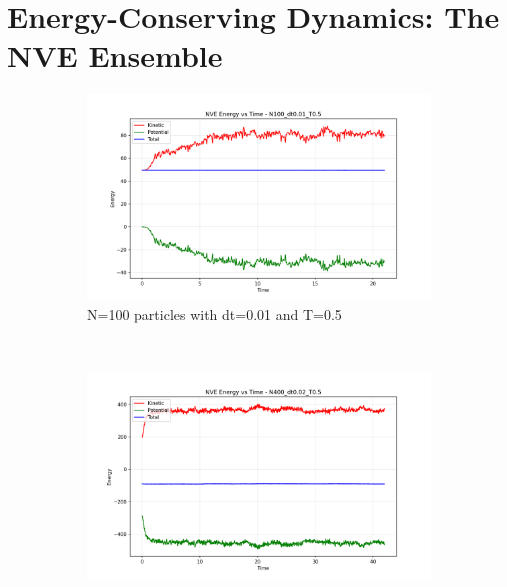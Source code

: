 \section{Energy-Conserving Dynamics: The NVE Ensemble}\label{sec:energy_conserving_dynamics_the_nve_ensemble} %
\begin{figure}[H]
	\centering
	\begin{subfigure}{0.5\textwidth}
		\includegraphics[width=\textwidth]{media/energy_N100_dt0.01_T0.5.png}
		\caption{N=100 particles with dt=0.01 and T=0.5}
		\label{sfig:energy_N100}
	\end{subfigure}%
	~
	\begin{subfigure}{0.5\textwidth}
		\includegraphics[width=\textwidth]{media/energy_N400_dt0.02_T0.5.png}

\end{subfigure}
\end{figure}
